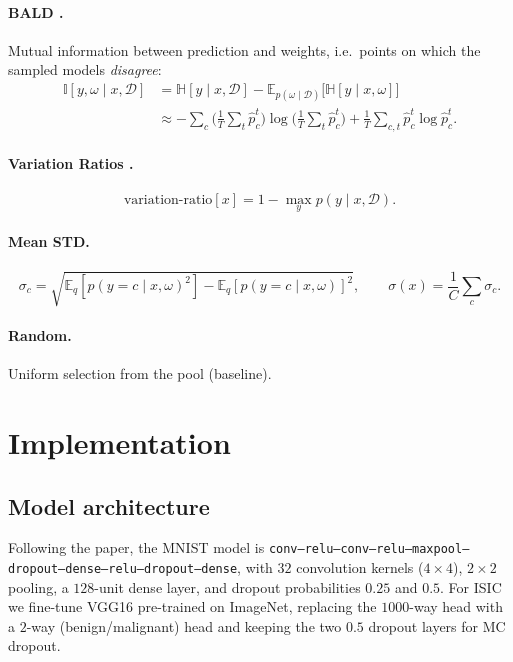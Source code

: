 \documentclass[11pt]{article}
\begin{document}
\paragraph{BALD \cite{houlsby2011bald}.}
Mutual information between prediction and weights, i.e.\ points on which the
sampled models \emph{disagree}:
\begin{align}
  \mathbb{I}[y,\omega\mid x,\mathcal{D}]
  &= \mathbb{H}[y\mid x,\mathcal{D}]
   - \mathbb{E}_{p(\omega\mid\mathcal{D})}\!\big[\mathbb{H}[y\mid x,\omega]\big]\\
  &\approx -\sum_c\Big(\tfrac{1}{T}\textstyle\sum_t \hat{p}^t_c\Big)
            \log\Big(\tfrac{1}{T}\textstyle\sum_t \hat{p}^t_c\Big)
          + \tfrac{1}{T}\sum_{c,t}\hat{p}^t_c\log\hat{p}^t_c .
  \label{eq:bald}
\end{align}

\paragraph{Variation Ratios \cite{freeman1965}.}
\begin{equation}
  \text{variation-ratio}[x] = 1 - \max_y p(y\mid x,\mathcal{D}).
\end{equation}

\paragraph{Mean STD.}
\begin{equation}
  \sigma_c = \sqrt{\mathbb{E}_q[p(y=c\mid x,\omega)^2]
                  - \mathbb{E}_q[p(y=c\mid x,\omega)]^2}, \qquad
  \sigma(x) = \frac{1}{C}\sum_c \sigma_c .
\end{equation}

\paragraph{Random.} Uniform selection from the pool (baseline).

\section{Implementation}
\label{sec:impl}

\subsection{Model architecture}
Following the paper, the MNIST model is
\texttt{conv--relu--conv--relu--maxpool--dropout--dense--relu--dropout--dense},
with $32$ convolution kernels ($4\!\times\!4$), $2\!\times\!2$ pooling, a
$128$-unit dense layer, and dropout probabilities $0.25$ and $0.5$. For ISIC we
fine-tune VGG16 \cite{simonyan2015vgg} pre-trained on ImageNet, replacing the
$1000$-way head with a $2$-way (benign/malignant) head and keeping the two
$0.5$ dropout layers for MC dropout.
\end{document}
